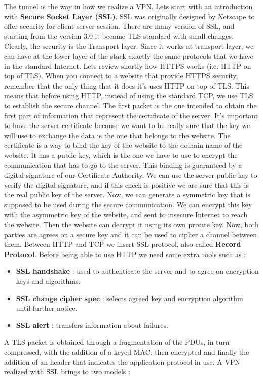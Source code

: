 \documentclass[11pt]{article}
\begin{document}
The tunnel is the way in how we realize a VPN. Lets start with an introduction with \textbf{Secure Socket Layer (SSL)}. SSL was originally designed by Netscape to offer security for client-server session. There are many version of SSL, and starting from the version 3.0 it became TLS standard with small changes. Clearly, the security is the Transport layer. Since it works at transport layer, we can have at the lower layer of the stack exactly the same protocols that we have in the standard Internet. Lets review shortly how HTTPS works (i.e. HTTP on top of TLS). When you connect to a website that provide HTTPS security, remember that the only thing that it does it's uses HTTP on top of TLS. This means that before using HTTP, instead of using the standard TCP, we use TLS to establish the secure channel. The first packet is the one intended to obtain the first part of information that represent the certificate of the server. It's important to have the server certificate because we want to be really sure that the key we will use to exchange the data is the one that belongs to the website. The certificate is a way to bind the key of the website to the domain name of the website. It has a public key, which is the one we have to use to encrypt the communication that has to go to the server. This binding is guaranteed by a digital signature of our Certificate Authority. We can use the server public key to verify the digital signature, and if this check is positive we are sure that this is the real public key of the server. Now, we can generate a symmetric key that is supposed to be used during the secure communication. We can encrypt this key with the asymmetric key of the website, and sent to insecure Internet to reach the website. Then the website can decrypt it using its own private key. Now, both parties are agrees on a secure key and it can be used to cipher a channel between them. Between HTTP and TCP we insert SSL protocol, also called \textbf{Record Protocol}. Before being able to use HTTP we need some extra tools such as :
\begin{itemize}
\item \textbf{SSL handshake} : used to authenticate the server and to agree on encryption keys and algorithms.
\item \textbf{SSL change cipher spec} : selects agreed key and encryption algorithm until further notice.
\item \textbf{SSL alert} : transfers information about failures.
\end{itemize}
A TLS packet is obtained through a fragmentation of the PDUs, in turn compressed, with the addition of a keyed MAC, then encrypted and finally the addition of an header that indicates the application protocol in use. A VPN realized with SSL brings to two models :
\end{document}
